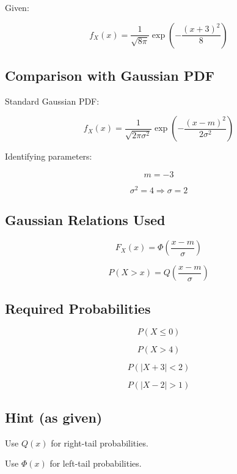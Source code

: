 \documentclass[12pt]{article}
\begin{document}
Given:

\[
f_X(x) = \frac{1}{\sqrt{8\pi}} \exp\left(-\frac{(x+3)^2}{8}\right)
\]

\subsection*{Comparison with Gaussian PDF}

Standard Gaussian PDF:

\[
f_X(x) = \frac{1}{\sqrt{2\pi\sigma^2}} \exp\left(-\frac{(x-m)^2}{2\sigma^2}\right)
\]

Identifying parameters:

\[
m = -3
\]

\[
\sigma^2 = 4 \Rightarrow \sigma = 2
\]

\subsection*{Gaussian Relations Used}

\[
F_X(x) = \Phi\left(\frac{x-m}{\sigma}\right)
\]

\[
P(X>x) = Q\left(\frac{x-m}{\sigma}\right)
\]

\subsection*{Required Probabilities}

\[
P(X \le 0)
\]

\[
P(X > 4)
\]

\[
P(|X+3| < 2)
\]

\[
P(|X-2| > 1)
\]

\subsection*{Hint (as given)}

Use $Q(x)$ for right-tail probabilities.

Use $\Phi(x)$ for left-tail probabilities.
\end{document}

